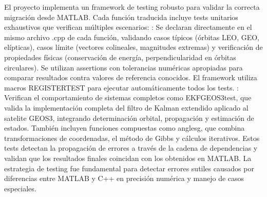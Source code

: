 \markdownRendererDocumentBegin
El proyecto implementa un framework de testing robusto para validar la correcta migración desde MATLAB. Cada función traducida incluye tests unitarios exhaustivos que verifican múltiples escenarios:\markdownRendererInterblockSeparator
{}: Se declaran directamente en el mismo archivo .cpp de cada función, validando casos típicos (órbitas LEO, GEO, elípticas), casos límite (vectores colineales, magnitudes extremas) y verificación de propiedades físicas (conservación de energía, perpendicularidad en órbitas circulares). Se utilizan assertions con tolerancias numéricas apropiadas para comparar resultados contra valores de referencia conocidos. El framework utiliza macros REGISTER\markdownRendererUnderscore{}TEST para ejecutar automáticamente todos los tests.\markdownRendererInterblockSeparator
{}: Verifican el comportamiento de sistemas completos como EKF\markdownRendererUnderscore{}GEOS3\markdownRendererUnderscore{}test, que valida la implementación completa del filtro de Kalman extendido aplicado al satelite GEOS3, integrando determinación orbital, propagación y estimación de estados. También incluyen funciones compuestas como anglesg, que combina transformaciones de coordenadas, el método de Gibbs y cálculos iterativos. Estos tests detectan la propagación de errores a través de la cadena de dependencias y validan que los resultados finales coincidan con los obtenidos en MATLAB.\markdownRendererInterblockSeparator
{}La estrategia de testing fue fundamental para detectar errores sutiles causados por diferencias entre MATLAB y C++ en precisión numérica y manejo de casos especiales.\markdownRendererDocumentEnd